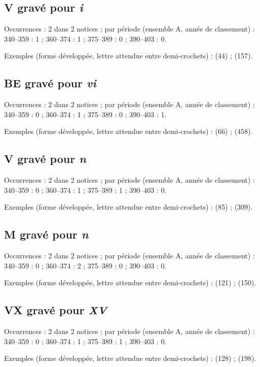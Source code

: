 \subsection*{V gravé pour \textit{i}}
\noindent Occurrences : 2 dans 2 notices ; par période (ensemble A, année de classement) : 340–359 : 1 ; 360–374 : 1 ; 375–389 : 0 ; 390–403 : 0.\par
\noindent Exemples (forme développée, lettre attendue entre demi-crochets) :  (44) ;  (157).\par
{}\par\medskip
\subsection*{BE gravé pour \textit{vi}}
\noindent Occurrences : 2 dans 2 notices ; par période (ensemble A, année de classement) : 340–359 : 0 ; 360–374 : 1 ; 375–389 : 0 ; 390–403 : 1.\par
\noindent Exemples (forme développée, lettre attendue entre demi-crochets) :  (66) ;  (458).\par
{}\par\medskip
\subsection*{V gravé pour \textit{n}}
\noindent Occurrences : 2 dans 2 notices ; par période (ensemble A, année de classement) : 340–359 : 0 ; 360–374 : 1 ; 375–389 : 1 ; 390–403 : 0.\par
\noindent Exemples (forme développée, lettre attendue entre demi-crochets) :  (85) ;  (309).\par
{}\par\medskip
\subsection*{M gravé pour \textit{n}}
\noindent Occurrences : 2 dans 2 notices ; par période (ensemble A, année de classement) : 340–359 : 0 ; 360–374 : 2 ; 375–389 : 0 ; 390–403 : 0.\par
\noindent Exemples (forme développée, lettre attendue entre demi-crochets) :  (121) ;  (150).\par
{}\par\medskip
\subsection*{VX gravé pour \textit{XV}}
\noindent Occurrences : 2 dans 2 notices ; par période (ensemble A, année de classement) : 340–359 : 0 ; 360–374 : 1 ; 375–389 : 1 ; 390–403 : 0.\par
\noindent Exemples (forme développée, lettre attendue entre demi-crochets) :  (128) ;  (198).\par
{}\par\medskip
